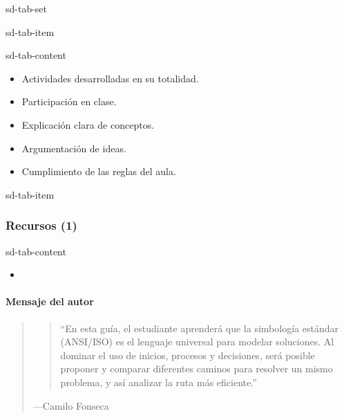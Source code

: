 \documentclass[letterpaper,10pt,spanish]{sphinxmanual}
\begin{document}
\begin{sphinxuseclass}{sd-tab-set}
\begin{sphinxuseclass}{sd-tab-item}
\begin{sphinxuseclass}{sd-tab-content}\begin{itemize}
\item {} 
\sphinxAtStartPar
Actividades desarrolladas en su totalidad.

\item {} 
\sphinxAtStartPar
Participación en clase.

\item {} 
\sphinxAtStartPar
Explicación clara de conceptos.

\item {} 
\sphinxAtStartPar
Argumentación de ideas.

\item {} 
\sphinxAtStartPar
Cumplimiento de las reglas del aula.

\end{itemize}

\end{sphinxuseclass}
\end{sphinxuseclass}
\begin{sphinxuseclass}{sd-tab-item}\subsubsection*{Recursos (1)}

\begin{sphinxuseclass}{sd-tab-content}\begin{itemize}
\item {} 
\sphinxAtStartPar
{\hyperref[\detokenize{cursos/ofimatica11/recursos/T02::doc}]{}}

\end{itemize}

\end{sphinxuseclass}
\end{sphinxuseclass}
\end{sphinxuseclass}

\paragraph{Mensaje del autor}
\label{\detokenize{cursos/ofimatica11/periodo01/G02:mensaje-del-autor}}\begin{quote}
\begin{quote}

\sphinxAtStartPar
“En esta guía, el estudiante aprenderá que la simbología estándar (ANSI/ISO) es el lenguaje universal para modelar soluciones. Al dominar el uso de inicios, procesos y decisiones, será posible proponer y comparar diferentes caminos para resolver un mismo problema, y así analizar la ruta más eficiente.”
\end{quote}

\begin{flushright}
---Camilo Fonseca
\end{flushright}
\end{quote}
\end{document}
